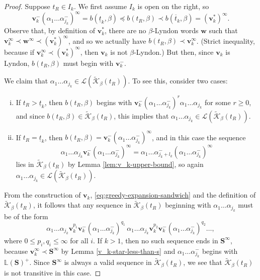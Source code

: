 \documentclass[11pt]{amsart}
\theoremstyle{definition}
\theoremstyle{remark}
\numberwithin{equation}{section}
\renewcommand{\L}{\ensuremath{\mathbb{L}}}
\newcommand{\Kt}{\widetilde{\mathcal{K}}}
\newcommand{\cs}{ {\mathbf{S}}}
\newcommand{\cL}{\mathcal{L}}
\renewcommand{\v}{\mathbf{v}}
\newcommand{\w}{\mathbf{w}}
\newcommand{\f}{\infty}
\newcommand{\al}{\alpha}
\newcommand{\lle}{\preccurlyeq}
\begin{document}
\begin{proof}
Suppose $t_R\in I_k$. We first assume $I_k$ is open on the right, so
\begin{equation} \label{eq:greedy-expansion-sandwich}
\v_k^-(\al_1\dots\al_{j_k}^-)^\f=b(\underline{t}_k,\beta)\lle b(t_R,\beta)\prec b(\overline{t}_k,\beta)=(\v_k^*)^\f.
\end{equation}
Observe that, by definition of $\v_k^*$, there are no $\beta$-Lyndon words $\w$ such that $\v_k^\f\prec \w^\f\prec (\v_k^*)^\f$, and so we actually have $b(t_R,\beta)\prec \v_k^\f$. (Strict inequality, because if $\v_k^\f\prec (\v_k^*)^\f$, then $\v_k$ is not $\beta$-Lyndon.) But then, since $\v_k$ is Lyndon, $b(t_R,\beta)$ must begin with $\v_k^-$.

We claim that $\al_1\dots\al_{j_k}\in \cL(\Kt_\beta(t_R))$. To see this, consider two cases:
\begin{enumerate}[(i)]
\item If $t_R>\underline{t}_k$, then $b(t_R,\beta)$ begins with $\v_k^-(\al_1\dots\al_{j_k}^-)^r\al_1\dots\al_{j_k}$ for some $r\geq 0$, and since $b(t_R,\beta)\in\Kt_\beta(t_R)$, this implies that $\al_1\dots\al_{j_k}\in \cL(\Kt_\beta(t_R))$.
\item If $t_R=\underline{t}_k$, then $b(t_R,\beta)=\v_k^-(\al_1\dots\al_{j_k}^-)^\f$, and in this case the sequence
\[
\al_1\dots\al_{j_k}\v_k^-(\al_1\dots\al_{j_k}^-)^\f {=\al_1\dots\al_{j_k+l_k}^-(\al_1\dots\al_{j_k}^-)^\f}
\]
lies in $\Kt_\beta(t_R)$ {by Lemma \ref{lem:v_k-upper-bound}}, so again $\al_1\dots\al_{j_k}\in \cL(\Kt_\beta(t_R))$.
\end{enumerate}

From the construction of $\v_k$, \eqref{eq:greedy-expansion-sandwich} and the definition of $\Kt_\beta(t_R)$, it follows that any sequence in $\Kt_\beta(t_R)$ beginning with $\al_1\dots\al_{j_k}$ must be of the form
\begin{equation} \label{eq:repeating-pattern}
\al_1\dots\al_{j_k} \v_k^{p_1}\v_k^-(\al_1\dots\al_{j_k}^-)^{q_1}\,\al_1\dots\al_{j_k} \v_k^{p_2}\v_k^-(\al_1\dots\al_{j_k}^-)^{q_2}\dots,
\end{equation}
where $0\leq p_i,q_i\leq\infty$ for all $i$. If $k>1$, then no such sequence ends in $\cs^\f$, because $\v_k^\f\prec\cs^\f$ by Lemma \ref{v_k-star-less-than-s} and $\al_1\dots\al_{j_k}^-$ begins with $\L(\cs)^+$. Since $\cs^\f$ is always a valid sequence in $\Kt_\beta(t_R)$, we see that $\Kt_\beta(t_R)$ is not transitive in this case. %


\end{proof}
\end{document}
